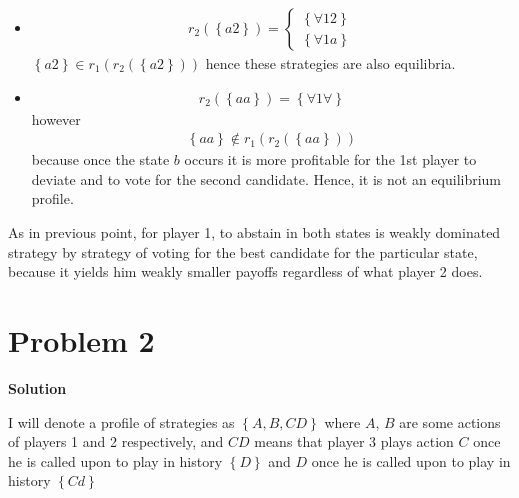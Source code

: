 \documentclass[a4paper]{article}
\begin{document}
\begin{enumerate}[(a)]
\begin{itemize}
	
	\item \begin{align*}
	r_2(\left\{a2\right\}) = \begin{cases}
	\left\{\forall 1 2\right\}\\
	\left\{\forall 1 a\right\}
	\end{cases}
	\end{align*}
	$\left\{a2\right\} \in r_1(r_2(\left\{a2\right\}))$ hence these strategies are also equilibria.
	\item \begin{align*}
	r_2(\left\{aa\right\}) = \left\{\forall 1 \forall \right\}
	\end{align*}
	however 
	\begin{align*}
	\left\{aa\right\} \notin r_1(r_2(\left\{aa\right\}))
	\end{align*}
	because once the state $b$ occurs it is more profitable for the 1st player to deviate and to vote for the second candidate. Hence, it is not an equilibrium profile.
	\end{itemize}
	As in previous point, for player 1, to abstain in both states is weakly dominated strategy by strategy of voting for the best candidate for the particular state, because it yields him weakly smaller payoffs regardless of what player 2 does.
	\end{enumerate}

\section*{Problem 2}

\textbf{Solution}


I will denote a profile of strategies as $\left\{A, B, CD\right\}$ where $A$, $B$ are some actions of players 1 and 2 respectively, and $CD$ means that player 3 plays action $C$ once he is called upon to play in history $\left\{D\right\}$ and $D$ once he is called upon to play in history $\left\{Cd\right\}$
\end{document}
